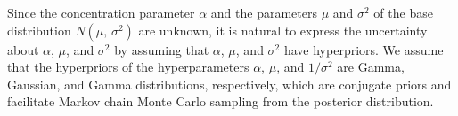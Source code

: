 Since the concentration parameter $\alpha$ and the parameters $\mu$ and $\sigma^2$ of the base distribution $N(\mu,\, \sigma^2)$ are unknown,
it is natural to express the uncertainty about $\alpha$, $\mu$, and $\sigma^2$ by assuming that $\alpha$, $\mu$, and $\sigma^2$ have hyperpriors.
We assume that the hyperpriors of the hyperparameters $\alpha$, $\mu$, and $1 / \sigma^{2}$ are Gamma, Gaussian, and Gamma distributions,
respectively,
which are conjugate priors and facilitate Markov chain Monte Carlo sampling from the posterior distribution.
